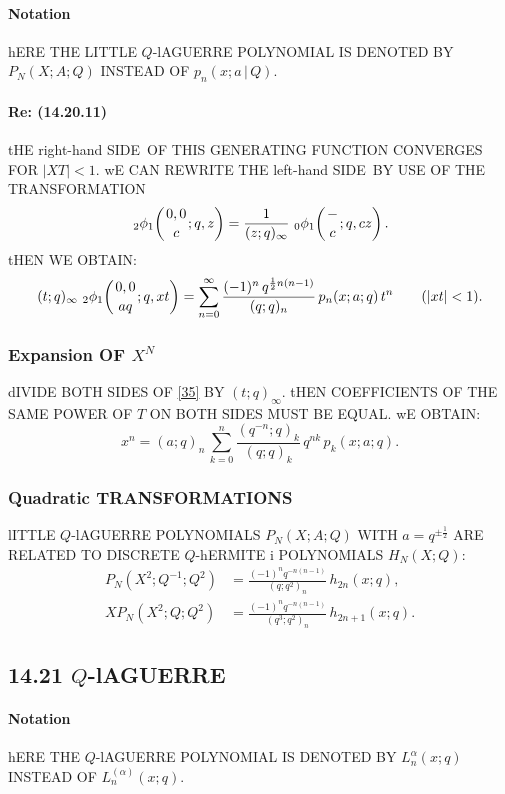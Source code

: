 \documentclass[twoside,11pt]{article}
\newcommand\al\alpha
\newcommand\half{\frac12}
\newcommand\iy\infty
\newcommand{\qhyp}[5]{\,\mbox{}_{#1}\phi_{#2}\!\left( 
  \genfrac{}{}{0pt}{}{#3}{#4};#5\right)}
\newcommand\LHS{left-hand SIDE}
\newcommand\RHS{right-hand SIDE}
\begin{document}
\paragraph{Notation} 
hERE THE LITTLE $Q$-lAGUERRE POLYNOMIAL IS DENOTED BY 
$P_N(X;A;Q)$ INSTEAD OF 
$p_n(x;a\,|\, Q)$. 
% 
\paragraph{Re: (14.20.11)} 
tHE \RHS\ OF THIS GENERATING FUNCTION CONVERGES FOR $|XT|<1$. 
wE CAN REWRITE THE \LHS\ BY USE OF THE TRANSFORMATION 
\begin{equation*} 
\qhyp21{0,0}c{q,z}=\frac1{(z;q)_\iy}\,\qhyp01-c{q,cz}. 
\end{equation*} 
tHEN WE OBTAIN: 
\begin{equation} 
(t;q)_\iy\,\qhyp21{0,0}{aq}{q,xt} 
=\sum_{n=0}^\iy\frac{(-1)^n\,q^{\half n(n-1)}}{(q;q)_n}\, 
p_n(x;a;q)\,t^n\qquad(|xt|<1). 
\label{35} 
\end{equation} 
% 
\subsubsection*{Expansion OF $X^N$} 
dIVIDE BOTH SIDES OF \eqref{35} BY $(t;q)_\iy$. tHEN COEFFICIENTS OF THE 
SAME POWER OF $T$ ON BOTH SIDES MUST BE EQUAL. wE OBTAIN: 
\begin{equation} 
x^n=(a;q)_n\,\sum_{k=0}^n \frac{(q^{-n};q)_k}{(q;q)_k}\,q^{nk}\,p_k(x;a;q). 
\label{36} 
\end{equation} 
% 
\subsubsection*{Quadratic TRANSFORMATIONS} 
lITTLE $Q$-lAGUERRE POLYNOMIALS $P_N(X;A;Q)$ WITH $a=q^{\pm\half}$ ARE 
RELATED TO DISCRETE $Q$-hERMITE i POLYNOMIALS $H_N(X;Q)$: 
\begin{align} 
P_N(X^2;Q^{-1};Q^2)&= 
\frac{(-1)^n q^{-n(n-1)}}{(q;q^2)_n}\,h_{2n}(x;q), 
\label{28}\\ 
XP_N(X^2;Q;Q^2)&= 
\frac{(-1)^n q^{-n(n-1)}}{(q^3;q^2)_n}\,h_{2n+1}(x;q). 
\label{29} 
\end{align} 
% 
\subsection*{14.21 $Q$-lAGUERRE} 
\label{sec14.21} 
% 
\paragraph{Notation} 
hERE THE $Q$-lAGUERRE POLYNOMIAL IS DENOTED BY $L_n^\al(x;q)$ INSTEAD OF 
$L_n^{(\al)}(x;q)$. 
% 
\end{document}
